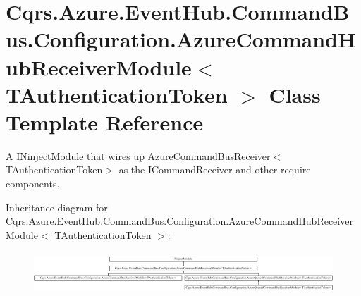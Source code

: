 \hypertarget{classCqrs_1_1Azure_1_1EventHub_1_1CommandBus_1_1Configuration_1_1AzureCommandHubReceiverModule}{}\section{Cqrs.\+Azure.\+Event\+Hub.\+Command\+Bus.\+Configuration.\+Azure\+Command\+Hub\+Receiver\+Module$<$ T\+Authentication\+Token $>$ Class Template Reference}
\label{classCqrs_1_1Azure_1_1EventHub_1_1CommandBus_1_1Configuration_1_1AzureCommandHubReceiverModule}


A I\+Ninject\+Module that wires up Azure\+Command\+Bus\+Receiver$<$\+T\+Authentication\+Token$>$ as the I\+Command\+Receiver and other require components.  


Inheritance diagram for Cqrs.\+Azure.\+Event\+Hub.\+Command\+Bus.\+Configuration.\+Azure\+Command\+Hub\+Receiver\+Module$<$ T\+Authentication\+Token $>$\+:\begin{figure}[H]
\begin{center}
\leavevmode
\includegraphics[height=1.595442cm]{classCqrs_1_1Azure_1_1EventHub_1_1CommandBus_1_1Configuration_1_1AzureCommandHubReceiverModule}
\end{center}
\end{figure}
